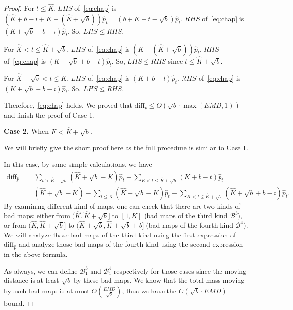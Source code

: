 \begin{proof}
    For $t \leq \hat{K}$, $LHS$ of~\eqref{eq:chap} is $(\hat{K}+b-t+K-(\hat{K}+\sqrt{b}))\hat{p}_t = (b+K-t-\sqrt{b})\hat{p}_t$. $RHS$ of~\eqref{eq:chap} is $(K+\sqrt{b}+b-t)\hat{p}_t$. So, $LHS \leq RHS$.

    For $\hat{K}<t \leq \hat{K}+\sqrt{b}$, $LHS$ of~\eqref{eq:chap} is $(K-(\hat{K}+\sqrt{b}))\hat{p}_t$. $RHS$ of~\eqref{eq:chap} is $(K+\sqrt{b}+b-t)\hat{p}_t$. So, $LHS \leq RHS$ since $t \leq \hat{K}+\sqrt{b}$.

    For $\hat{K}+\sqrt{b}<t \leq K$, $LHS$ of~\eqref{eq:chap} is $(K+b-t)\hat{p}_t$. $RHS$ of~\eqref{eq:chap} is $(K+\sqrt{b}+b-t)\hat{p}_t$. So, $LHS \leq RHS$.

    Therefore,~\eqref{eq:chap} holds. We proved that $\text{diff}_p \leq O(\sqrt{b} \cdot \max(EMD,1))$ and finish the proof of Case 1.

    \textbf{Case 2.} When $K < \hat{K} + \sqrt{b}$. 

    We will briefly give the short proof here as the full procedure is similar to Case 1.

    In this case, by some simple calculations, we have 
    \begin{align*}
    \text{diff}_{\hat{p}} =& \sum_{t> \hat{K}+\sqrt{b}}(\hat{K}+\sqrt{b}-K)\hat{p}_t - \sum_{K < t \leq \hat{K}+\sqrt{b}}(K+b-t)\hat{p}_t\\
    =& (\hat{K}+\sqrt{b}-K) - \sum_{t \leq K}(\hat{K}+\sqrt{b}-K)\hat{p}_t - \sum_{K<t \leq \hat{K}+\sqrt{b}}(\hat{K}+\sqrt{b}+b-t)\hat{p}_t.
    \end{align*}
    By examining different kind of maps, one can check that there are two kinds of bad maps: either from $(\hat{K},\hat{K}+\sqrt{b}]$ to $[1,K]$ (bad maps of the third kind $\mathcal{B}^3$), or from $(\hat{K},\hat{K}+\sqrt{b}]$ to $(\hat{K}+\sqrt{b},\hat{K}+\sqrt{b}+b]$ (bad maps of the fourth kind $\mathcal{B}^4$). We will analyze those bad maps of the third kind using the first expression of $\text{diff}_{\hat{p}}$ and analyze those bad maps of the fourth kind using the second expression in the above formula.

    As always, we can define $\mathcal{B}^3_1$ and $\mathcal{B}^4_1$ respectively for those cases since the moving distance is at least $\sqrt{b}$ by these bad maps. We know that the total mass moving by such bad maps is at most $O(\frac{EMD}{\sqrt{b}})$, thus we have the $O(\sqrt{b} \cdot EMD)$ bound. 


\end{proof}
